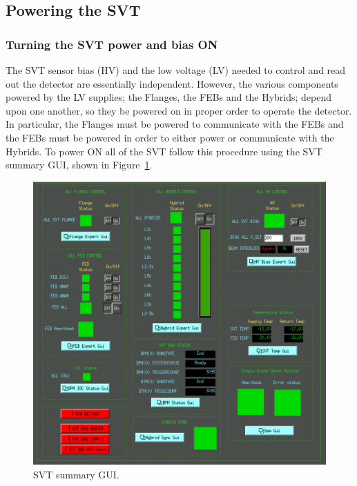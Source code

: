 \documentclass[12pt]{report}
\begin{document}
\subsection{Powering the SVT}
\label{sec:proc_voltages}

\subsubsection{Turning the SVT power and bias ON}
\label{sec:proc_voltages_allon}
The SVT sensor bias (HV) and the low voltage (LV) needed to control and read out the detector are essentially independent.  However, the various components powered by the LV supplies; the Flanges, the FEBs and the Hybrids; depend upon one another, so they be powered on in proper order to operate the detector.  In particular, the Flanges must be powered to communicate with the FEBs and the FEBs must be powered in order to either power or communicate with the Hybrids. To power ON all of the SVT follow this procedure using the SVT summary GUI, shown in Figure~\ref{fig:svt_summary_gui}.
\begin{figure}[htbp]
\begin{center}
    \includegraphics[width=\textwidth]{svt_summary_gui.png}
\caption{SVT summary GUI.}
\label{fig:svt_summary_gui}
\end{center}
\vspace*{-5mm}
\end{figure}
\end{document}
